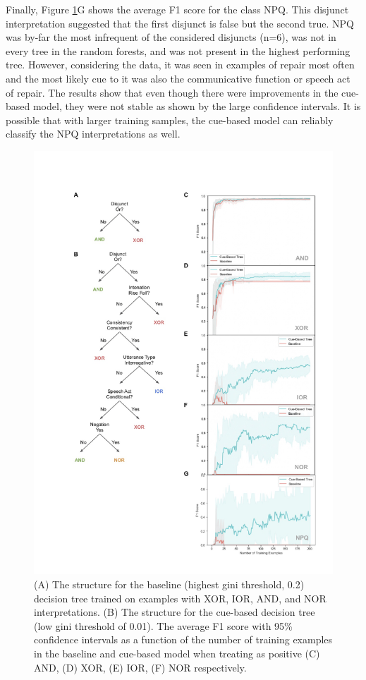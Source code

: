 \documentclass[,man,floatsintext]{apa6}
\begin{document}
Finally, Figure \ref{fig:wholeFigure}G shows the average F1 score for the class NPQ. This disjunct interpretation suggested that the first disjunct is false but the second true. NPQ was by-far the most infrequent of the considered disjuncts (n=6), was not in every tree in the random forests, and was not present in the highest performing tree. However, considering the data, it was seen in examples of repair most often and the most likely cue to it was also the communicative function or speech act of repair. The results show that even though there were improvements in the cue-based model, they were not stable as shown by the large confidence intervals. It is possible that with larger training samples, the cue-based model can reliably classify the NPQ interpretations as well.

\begin{figure}
\centering
\includegraphics{figs/wholeFigure-1.pdf}
\caption{\label{fig:wholeFigure}(A) The structure for the baseline (highest gini threshold, 0.2) decision tree trained on examples with XOR, IOR, AND, and NOR interpretations. (B) The structure for the cue-based decision tree (low gini threshold of 0.01). The average F1 score with 95\% confidence intervals as a function of the number of training examples in the baseline and cue-based model when treating as positive (C) AND, (D) XOR, (E) IOR, (F) NOR respectively.}
\end{figure}
\end{document}
